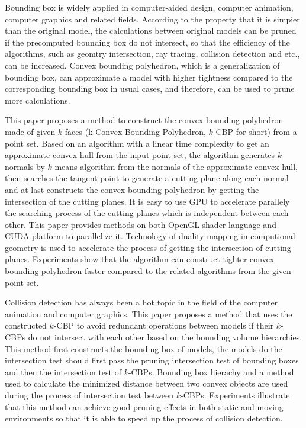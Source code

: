 \begin{eabstract} 
Bounding box is widely applied in computer-aided design, computer animation, computer graphics and related fields. 
According to the property that it is simpier than the original model, the calculations between original models can be pruned if the precomputed bounding box do not intersect, so that the efficiency of the algorithms, such as geomtry intersection, ray tracing, collision detection and etc., can be increased.
Convex bounding polyhedron, which is a generalization of bounding box,  can approximate a model with higher tightness compared to the corresponding bounding box in usual cases, and therefore, can be used to prune more calculations.

This paper proposes a method to construct the convex bounding polyhedron made of given $k$ faces (k-Convex Bounding Polyhedron, $k$-CBP for short) from a point set.
Based on an algorithm with a linear time complexity to get an approximate convex hull from the input point set, 
the algorithm generates $k$ normals by $k$-means algorithm from the normals of the approximate convex hull,  
then searches the tangent point to generate a cutting plane along each normal and at last constructs the convex bounding polyhedron by getting the intersection of the cutting planes. 
It is easy to use GPU to accelerate parallely  the searching process of the cutting planes which is independent between each other. 
This paper provides methods on both OpenGL shader language and CUDA platform to parallelize it. 
Technology of duality mapping in computional geometry is used to accelerate the process of getting the intersection of cutting planes. 
Experiments show that the algorithm can construct tighter convex bounding polyhedron faster compared to the related algorithms from the given point set.

Collision detection has always been a hot topic in the field of the computer animation and computer graphics. 
This paper proposes a method that uses the constructed $k$-CBP to avoid redundant operations between models if their $k$-CBPs do not intersect with each other based on the bounding volume hierarchies.
This method first constructs the bounding box of models, the models do the intersection test should first pass the pruning intersection test of bounding boxes and then the intersection test of $k$-CBPs. 
Bounding box hierachy and a method used to calculate the minimized distance between two convex objects are used during the process of intersection test between $k$-CBPs. 
Experiments illustrate that this method can achieve good pruning effects in both static and moving environments so that it is able to speed up the process of collision detection.

\end{eabstract}


